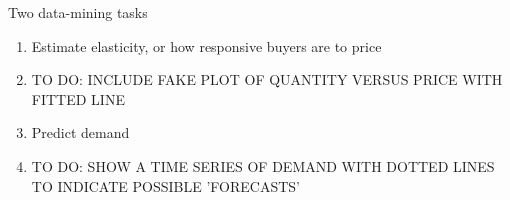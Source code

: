 \documentclass{beamer}
\begin{document}
\begin{frame}{Two data-mining tasks}
\begin{enumerate}
	\item Estimate elasticity, or how responsive buyers are to price
	\item TO DO: INCLUDE FAKE PLOT OF QUANTITY VERSUS PRICE WITH FITTED LINE
	\item Predict demand
	\item TO DO: SHOW A TIME SERIES OF DEMAND WITH DOTTED LINES TO INDICATE POSSIBLE 'FORECASTS'
\end{enumerate}
\end{frame}
\end{document}
